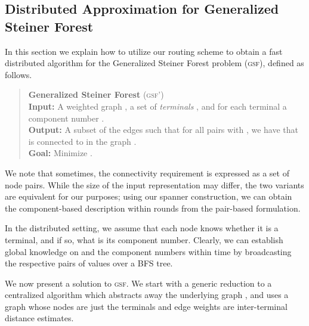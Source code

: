 \documentclass[letterpaper,11pt]{article}
\newcommand{\gsf}{\textsc{gsf}}
\begin{document}
\subsection{Distributed Approximation for Generalized Steiner Forest}
\label{sec:steiner}

In this section we explain how to utilize our routing scheme to obtain
a fast distributed algorithm for the Generalized Steiner Forest
problem (\gsf), defined as follows.

\begin{quote}\textbf{Generalized Steiner Forest} (\gsf')\\
  \textbf{Input:} A weighted graph , a set of \emph{terminals}
  , and for each terminal  a component number .\\
  \textbf{Output:} A subset of the edges  such that for all pairs
   with , we have that  is connected to 
  in the graph   .\\
  \textbf{Goal:} Minimize .
\end{quote}
We note that sometimes, the connectivity requirement  is expressed
as a set of node pairs. While the size of the input representation may differ,
the two variants are equivalent for our purposes; using our spanner
construction, we can obtain the component-based description within
 rounds from the pair-based formulation.

In the distributed setting, we assume that each node knows whether it is a
terminal, and if so, what is its component number. Clearly, we can establish
global knowledge on  and the component numbers within time  by
broadcasting the respective pairs of values over a BFS tree. 

We now present a solution to \gsf. We start with a generic reduction to a
centralized algorithm which abstracts away the underlying graph ,
and uses a graph whose nodes are just the terminals and edge weights
are inter-terminal distance estimates.
\end{document}
